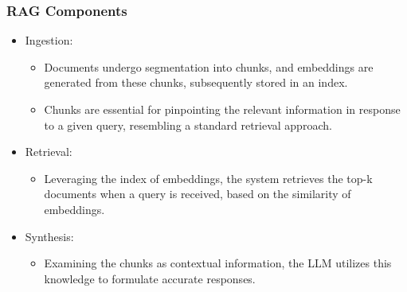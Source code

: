 \begin{frame}[fragile]\frametitle{RAG Components}


\begin{itemize}
  \item Ingestion:
	\begin{itemize}
	  \item Documents undergo segmentation into chunks, and embeddings are generated from these chunks, subsequently stored in an index.
	  \item Chunks are essential for pinpointing the relevant information in response to a given query, resembling a standard retrieval approach.
	  \end{itemize}

  \item Retrieval:
	\begin{itemize}
	  \item Leveraging the index of embeddings, the system retrieves the top-k documents when a query is received, based on the similarity of embeddings.
	\end{itemize}
	  
  \item Synthesis:
	\begin{itemize}
	  \item Examining the chunks as contextual information, the LLM utilizes this knowledge to formulate accurate responses.
	\end{itemize}

\end{itemize}

\end{frame}





